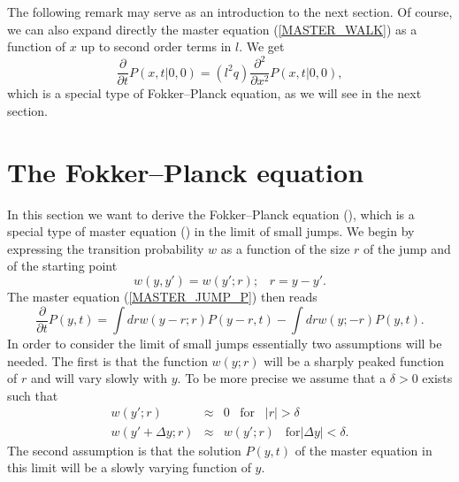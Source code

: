 The following remark may serve as an introduction to the next 
section. Of course, we can also expand directly the master equation
(\ref{MASTER_WALK}) as a function of $x$ up to second order terms 
in $l$. We get
\begin{equation*}
\frac{\partial}{\partial t} P(x,t|0,0) =
     (l^2q) \frac{\partial^2}{\partial x^2} P(x,t|0,0),
\end{equation*}
which is a special type of Fokker--Planck equation, as we will see 
in the next section.

\section{The Fokker--Planck equation}
In this section we want to derive the Fokker--Planck equation
(\cite{RISKEN}),
which is a special type of master equation (\cite{VAN_KAMPEN})
in the limit of small jumps.
We begin by expressing the transition probability $w$ as a 
function of the size $r$ of the jump and of the starting point
\begin{equation*}
w(y,y') = w(y';r); \;\;\; r=y-y'.
\end{equation*}
The master equation (\ref{MASTER_JUMP_P}) then reads
\begin{equation}
\label{MASTER_SMALL_JUMP}
\frac{\partial}{\partial t} P(y,t) =
  \int dr w(y-r;r)P(y-r,t) - \int dr w(y;-r)P(y,t).
\end{equation}
In order to consider the limit of small jumps essentially
two assumptions will be needed. The first is that
the function
$w(y;r)$ will be a sharply peaked function of $r$ and will
vary slowly with $y$. To be more precise we assume that a $\delta >0$
exists such that
\begin{eqnarray*}
w(y';r)  & \approx & 0 \;\;\; \text{for} \;\;\; |r|> \delta \\
w(y'+\Delta y;r) & \approx & w(y';r) \;\;\; \text{for} |\Delta y| < 
\delta.
\end{eqnarray*}
The second assumption is that the solution $P(y,t)$ of the master equation 
in this limit will be a slowly varying function of $y$.

